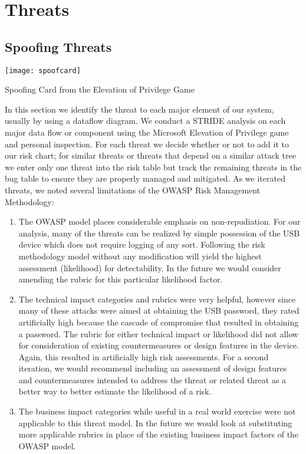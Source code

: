 \section{Threats}
\label{sec:threats}

\subsection{Spoofing Threats}

\begin{marginfigure}%
\centering
  \texttt{[image: spoofcard]}
  \caption{Spoofing Card from the Elevation of Privilege Game}
  \label{fig:spoofcard}
\end{marginfigure}

In this section we identify the threat to each major element of our
system, usually by using a dataflow diagram.  We conduct a STRIDE analysis on each major data flow or component using the Microsoft Elevation of Privilege game and personal inspection.  For each threat we decide whether or not to add it to our risk chart; for similar threats or threats that depend on a similar attack tree we enter only one threat into the risk table but track the remaining threats in the bug table to ensure they are properly managed and mitigated. As we iterated threats, we noted several limitations of the OWASP Risk Management Methodology:
\begin{enumerate}
    \item{The OWASP model places considerable emphasis on non-repudiation.  For our analysis, many of the threats can be realized by simple possession of the USB device which does not require logging of any sort.  Following the risk methodology model without any modification will yield the highest assessment (likelihood) for detectability. In the future we would consider amending the rubric for this particular likelihood factor.}
    \item{The technical impact categories and rubrics were very helpful, however since many of these attacks were aimed at obtaining the USB password, they rated artificially high because the cascade of compromise that resulted in obtaining a password. The rubric for either technical impact or likelihood did not allow for consideration of existing countermeasures or design features in the device.  Again, this resulted in artificially high risk assessments.  For a second iteration, we would recommend including an assessment of design features and countermeasures intended to address the threat or related threat as a better way to better estimate the likelihood of a risk.}
    \item{The business impact categories while useful in a real world exercise were not applicable to this threat model.  In the future we would look at substituting more applicable rubrics in place of the existing business impact factors of the OWASP model.}
\end{enumerate}


